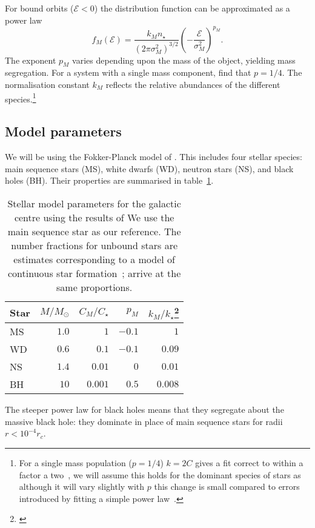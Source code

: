 \documentclass[useAMS,usedcolumn,usegraphicx,usenatbib]{mn2e}
\newcommand{\tabref}[1]{table~\ref{tab:#1}}
\begin{document}
For bound orbits ($\mathcal{E} < 0$) the distribution function can be approximated as a power law
\begin{equation}
f_M(\mathcal{E}) = \frac{k_M n_\star}{(2\pi\sigma_M^2)^{3/2}}\left(-\frac{\mathcal{E}}{\sigma_M^2}\right)^{p_M}.
\end{equation}
The exponent $p_M$ varies depending upon the mass of the object, yielding mass segregation. For a system with a single mass component, \citet{Bahcall1976} find that $p = 1/4$. The normalisation constant $k_M$ reflects the relative abundances of the different species.\footnote{For a single mass population ($p = 1/4$) $k = 2 C$ gives a fit correct to within a factor a two~\citep{Bahcall1976,Keshet2009}, we will assume this holds for the dominant species of stars as although it will vary slightly with $p$ this change is small compared to errors introduced by fitting a simple power law~\citep{Hopman2006, Alexander2009}.}

\subsection{Model parameters}

We will be using the Fokker-Planck model of \citet{Hopman2006, Hopman2006a, Alexander2009}. This includes four stellar species: main sequence stars (MS), white dwarfs (WD), neutron stars (NS), and black holes (BH). Their properties are summarised in \tabref{HA}.
\begin{table}
\begin{minipage}{\columnwidth}
 \centering
  \caption{Stellar model parameters for the galactic centre using the results of \citet{Alexander2009} We use the main sequence star as our reference. The number fractions for unbound stars are estimates corresponding to a model of continuous star formation~\citep{Alexander2005}; \citet{O'Leary2009} arrive at the same proportions.\label{tab:HA}}
  \begin{tabular}{@{}lrrrr@{}}
  \hline
   Star & $M/M_\odot$ & $C_M/C_\star$ & $p_M$ & $k_M/k_\star$\footnote{\citet{Toonen2009}} \\
 \hline
 MS & $1.0$ & $1$ & $-0.1$ & $1$ \\
 WD & $0.6$ & $0.1$ & $-0.1$ & $0.09$ \\
 NS & $1.4$ & $0.01$ & $0$ & $0.01$  \\
 BH & $10$ & $0.001$ & $0.5$ & $0.008$ \\
\hline
\end{tabular}
\end{minipage}
\end{table}
The steeper power law for black holes means that they segregate about the massive black hole: they dominate in place of main sequence stars for radii $r < 10^{-4}r_c$.
\end{document}

